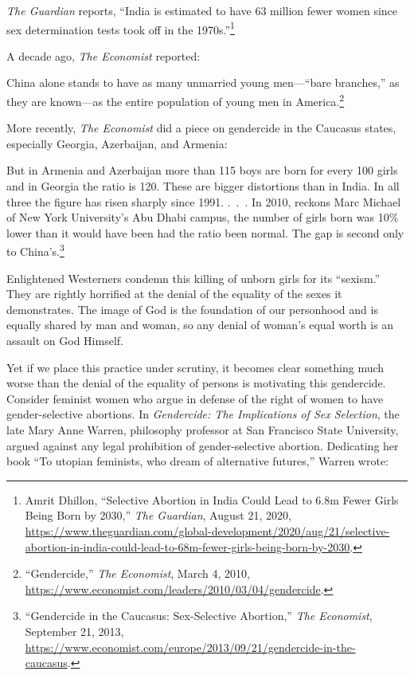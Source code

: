 \documentclass[
]{book}
\begin{document}
\emph{The Guardian} reports, ``India is estimated to have 63 million fewer women since sex determination tests took off in the 1970s.''\footnote{Amrit Dhillon, ``Selective Abortion in India Could Lead to 6.8m Fewer Girls Being Born by 2030,'' \emph{The Guardian}, August 21, 2020, \url{https://www.theguardian.com/global-development/2020/aug/21/selective-abortion-in-india-could-lead-to-68m-fewer-girls-being-born-by-2030}.}

A decade ago, \emph{The Economist} reported:

China alone stands to have as many unmarried young men---``bare branches,'' as they are known---as the entire population of young men in America.\footnote{``Gendercide,'' \emph{The Economist}, March 4, 2010, \url{https://www.economist.com/leaders/2010/03/04/gendercide}.}

More recently, \emph{The Economist} did a piece on gendercide in the Caucasus states, especially Georgia, Azerbaijan, and Armenia:

But in Armenia and Azerbaijan more than 115 boys are born for every 100 girls and in Georgia the ratio is 120. These are bigger distortions than in India. In all three the figure has risen sharply since 1991. .~.~. In 2010, reckons Marc Michael of New York University's Abu Dhabi campus, the number of girls born was 10\% lower than it would have been had the ratio been normal. The gap is second only to China's.\footnote{``Gendercide in the Caucasus: Sex-Selective Abortion,'' \emph{The Economist}, September 21, 2013, \url{https://www.economist.com/europe/2013/09/21/gendercide-in-the-caucasus}.}

Enlightened Westerners condemn this killing of unborn girls for its ``sexism.'' They are rightly horrified at the denial of the equality of the sexes it demonstrates. The image of God is the foundation of our personhood and is equally shared by man and woman, so any denial of woman's equal worth is an assault on God Himself.

Yet if we place this practice under scrutiny, it becomes clear something much worse than the denial of the equality of persons is motivating this gendercide. Consider feminist women who argue in defense of the right of women to have gender-selective abortions. In \emph{Gendercide: The Implications of Sex Selection}, the late Mary Anne Warren, philosophy professor at San Francisco State University, argued against any legal prohibition of gender-selective abortion. Dedicating her book ``To utopian feminists, who dream of alternative futures,'' Warren wrote:
\end{document}
